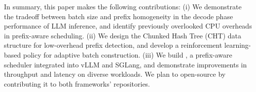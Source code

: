 In summary, this paper makes the following contributions: (i) We demonstrate the tradeoff between batch size and prefix homogeneity in the decode phase performance of LLM inference, and identify previously overlooked CPU overheads in prefix-aware scheduling. (ii) We design the Chunked Hash Tree (CHT) data structure for low-overhead prefix detection, and develop a reinforcement learning-based policy for adaptive batch construction. (iii) We build \Feather, a prefix-aware scheduler integrated into vLLM and SGLang, and demonstrate improvements in throughput and latency on diverse workloads. We plan to open-source \Feather by contributing it to both frameworks' repositories.